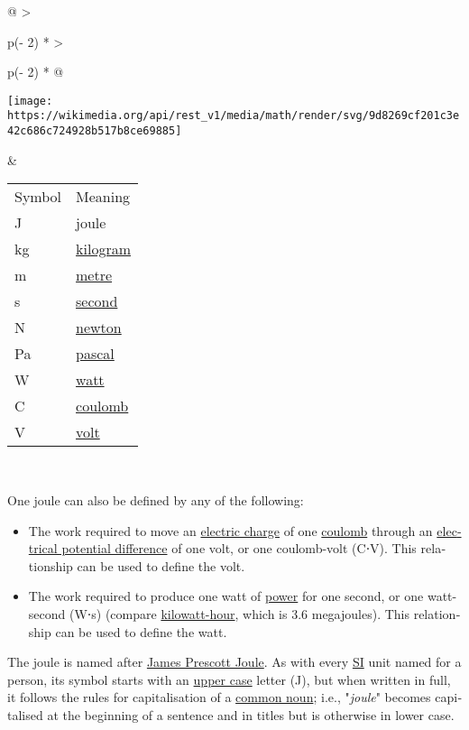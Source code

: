 \documentclass[
]{article}
\providecommand{\tightlist}{%
  \setlength{\itemsep}{0pt}\setlength{\parskip}{0pt}}
\newenvironment{LTR}{\beginL}{\endL}
\begin{document}
\begin{LTR}
\begin{otherlanguage}{english}
\begin{longtable}[]{@{}
  >{\raggedright\arraybackslash}p{(\columnwidth - 2\tabcolsep) * }
  >{\raggedright\arraybackslash}p{(\columnwidth - 2\tabcolsep) * }@{}}
\begin{minipage}[t]{\linewidth}
\texttt{[image: https://wikimedia.org/api/rest\_v1/media/math/render/svg/9d8269cf201c3e42c686c724928b517b8ce69885]}
\end{minipage} & \begin{minipage}[t]{\linewidth}\raggedright
\begin{longtable}[]{@{}ll@{}}
\toprule\noalign{}
\endhead
\bottomrule\noalign{}
\endlastfoot
Symbol & Meaning \\
J & joule \\
kg & \href{/wiki/Kilogram}{kilogram} \\
m & \href{/wiki/Metre}{metre} \\
s & \href{/wiki/Second}{second} \\
N & \href{/wiki/Newton_(unit)}{newton} \\
Pa & \href{/wiki/Pascal_(unit)}{pascal} \\
W & \href{/wiki/Watt}{watt} \\
C & \href{/wiki/Coulomb}{coulomb} \\
V & \href{/wiki/Volt}{volt} \\
\end{longtable}
\end{minipage} \\
\end{longtable}

One joule can also be defined by any of the following:

\begin{itemize}
\tightlist
\item
  The work required to move an \href{/wiki/Electric_charge}{electric
  charge} of one \href{/wiki/Coulomb}{coulomb} through an
  \href{/wiki/Voltage}{electrical potential difference} of one volt, or
  one coulomb-volt (C⋅V). This relationship can be used to define the
  volt.
\item
  The work required to produce one watt of
  \href{/wiki/Power_(physics)}{power} for one second, or one watt-second
  (W⋅s) (compare \href{/wiki/Kilowatt-hour}{kilowatt-hour}, which is 3.6
  megajoules). This relationship can be used to define the watt.
\end{itemize}

The joule is named after \href{/wiki/James_Prescott_Joule}{James
Prescott Joule}. As with every
\href{/wiki/International_System_of_Units}{SI} unit named for a person,
its symbol starts with an \href{/wiki/Upper_case}{upper case} letter
(J), but when written in full, it follows the rules for capitalisation
of a \href{/wiki/Common_noun}{common noun}; i.e., "\emph{joule}" becomes
capitalised at the beginning of a sentence and in titles but is
otherwise in lower case.


\end{otherlanguage}
\end{LTR}
\end{document}
